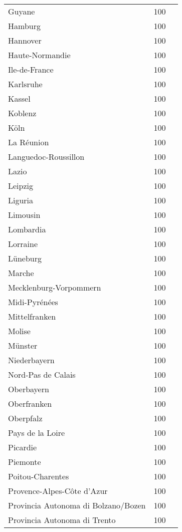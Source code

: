 \begin{table}[H]
\begin{tabularx}{\textwidth}{Xcc}
            Guyane & 100 \\
            Hamburg & 100 \\
            Hannover & 100 \\
            Haute-Normandie  & 100 \\
            Ile-de-France & 100 \\
            Karlsruhe & 100 \\
            Kassel & 100 \\
            Koblenz & 100 \\
            Köln & 100 \\
            La Réunion  & 100 \\
            Languedoc-Roussillon & 100 \\
            Lazio & 100 \\
            Leipzig & 100 \\
            Liguria & 100 \\
            Limousin & 100 \\
            Lombardia & 100 \\
            Lorraine & 100 \\
            Lüneburg & 100 \\
            Marche & 100 \\
            Mecklenburg-Vorpommern & 100 \\
            Midi-Pyrénées & 100 \\
            Mittelfranken & 100 \\
            Molise & 100 \\
            Münster & 100 \\
            Niederbayern & 100 \\
            Nord-Pas de Calais & 100 \\
            Oberbayern & 100 \\
            Oberfranken & 100 \\
            Oberpfalz & 100 \\
            Pays de la Loire & 100 \\
            Picardie & 100 \\
            Piemonte & 100 \\
            Poitou-Charentes & 100 \\
            Provence-Alpes-Côte d’Azur & 100 \\
            Provincia Autonoma di Bolzano/Bozen & 100 \\
            Provincia Autonoma di Trento & 100 \\

\end{tabularx}
\end{table}
